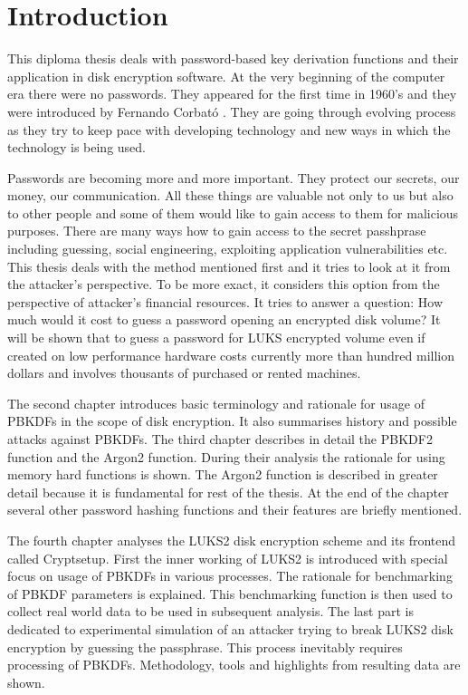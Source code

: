 \documentclass[nolof]{fithesis3}
\begin{document}
\tableofcontents
\chapter{Introduction}
This diploma thesis deals with password-based key derivation functions and their application in disk encryption software. At the very beginning of the computer era there were no passwords. They appeared for the first time in 1960's and they were introduced by Fernando Corbató \parencite{ctss}. They are going through evolving process as they try to keep pace with developing technology and new ways in which the technology is being used.

Passwords are becoming more and more important. They protect our secrets, our money, our communication. All these things are valuable not only to us but also to other people and some of them would like to gain access to them for malicious purposes. There are many ways how to gain access to the secret passhprase including guessing, social engineering, exploiting application vulnerabilities etc. This thesis deals with the method mentioned first and it tries to look at it from the attacker's perspective. To be more exact, it considers this option from the perspective of attacker's financial resources. It tries to answer a question: How much would it cost to guess a password opening an encrypted disk volume? It will be shown that to guess a password for LUKS encrypted volume even if created on low performance hardware costs currently more than hundred million dollars and involves thousants of purchased or rented machines.

The second chapter introduces basic terminology and rationale for usage of PBKDFs in the scope of disk encryption. It also summarises history and possible attacks against PBKDFs. The third chapter describes in detail the PBKDF2 function and the Argon2 function. During their analysis the rationale for using memory hard functions is shown. The Argon2 function is described in greater detail because it is fundamental for rest of the thesis. At the end of the chapter several other password hashing functions and their features are briefly mentioned.

The fourth chapter analyses the LUKS2 disk encryption scheme and its frontend called Cryptsetup. First the inner working of LUKS2 is introduced with special focus on usage of PBKDFs in various processes. The rationale for benchmarking of PBKDF parameters is explained. This benchmarking function is then used to collect real world data to be used in subsequent analysis. The last part is dedicated to experimental simulation of an attacker trying to break LUKS2 disk encryption by guessing the passphrase. This process inevitably requires processing of PBKDFs. Methodology, tools and highlights from resulting data are shown.
\end{document}

